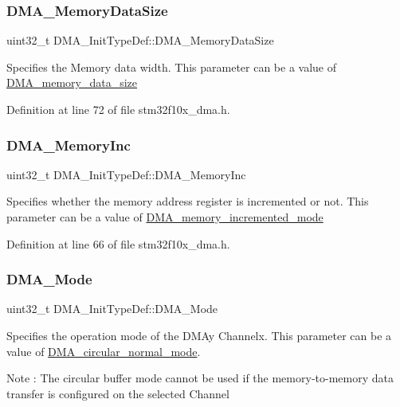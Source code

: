 \subsubsection{\texorpdfstring{D\+M\+A\+\_\+\+Memory\+Data\+Size}{DMA\_MemoryDataSize}}
{\footnotesize\ttfamily uint32\+\_\+t D\+M\+A\+\_\+\+Init\+Type\+Def\+::\+D\+M\+A\+\_\+\+Memory\+Data\+Size}

Specifies the Memory data width. This parameter can be a value of \hyperlink{group___d_m_a__memory__data__size}{D\+M\+A\+\_\+memory\+\_\+data\+\_\+size} 

Definition at line 72 of file stm32f10x\+\_\+dma.\+h.

\mbox{\label{struct_d_m_a___init_type_def_aaf69c680a297ec01a2ed613289e691a1}} 
\subsubsection{\texorpdfstring{D\+M\+A\+\_\+\+Memory\+Inc}{DMA\_MemoryInc}}
{\footnotesize\ttfamily uint32\+\_\+t D\+M\+A\+\_\+\+Init\+Type\+Def\+::\+D\+M\+A\+\_\+\+Memory\+Inc}

Specifies whether the memory address register is incremented or not. This parameter can be a value of \hyperlink{group___d_m_a__memory__incremented__mode}{D\+M\+A\+\_\+memory\+\_\+incremented\+\_\+mode} 

Definition at line 66 of file stm32f10x\+\_\+dma.\+h.

\mbox{\label{struct_d_m_a___init_type_def_a8adbe6f3e46471d109afaa3111dce220}} 
\subsubsection{\texorpdfstring{D\+M\+A\+\_\+\+Mode}{DMA\_Mode}}
{\footnotesize\ttfamily uint32\+\_\+t D\+M\+A\+\_\+\+Init\+Type\+Def\+::\+D\+M\+A\+\_\+\+Mode}

Specifies the operation mode of the D\+M\+Ay Channelx. This parameter can be a value of \hyperlink{group___d_m_a__circular__normal__mode}{D\+M\+A\+\_\+circular\+\_\+normal\+\_\+mode}. \begin{DoxyNote}{Note}
\+: The circular buffer mode cannot be used if the memory-\/to-\/memory data transfer is configured on the selected Channel 
\end{DoxyNote}


